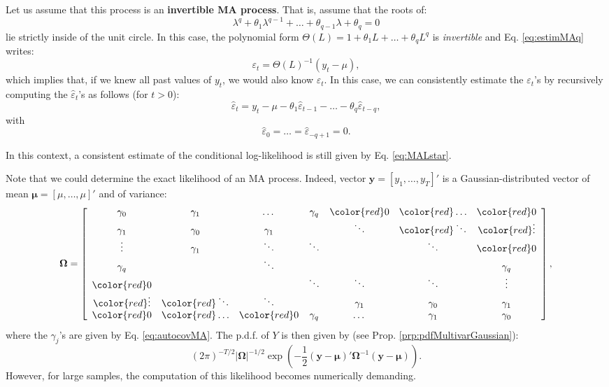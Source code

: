 \documentclass[
  12pt,
]{book}
\theoremstyle{definition}
\theoremstyle{definition}
\theoremstyle{definition}
\theoremstyle{definition}
\theoremstyle{remark}
\begin{document}
Let us assume that this process is an \textbf{invertible MA process}. That is, assume that the roots of:
\begin{equation}
\lambda^q + \theta_1 \lambda^{q-1} + \dots + \theta_{q-1} \lambda + \theta_q = 0 \label{eq:invertible}
\end{equation}
lie strictly inside of the unit circle. In this case, the polynomial form \(\Theta(L)=1 + \theta_1 L + \dots + \theta_q L^q\) is \emph{invertible} and Eq. \eqref{eq:estimMAq} writes:
\[
\varepsilon_t = \Theta(L)^{-1}(y_t - \mu),
\]
which implies that, if we knew all past values of \(y_t\), we would also know \(\varepsilon_t\). In this case, we can consistently estimate the \(\varepsilon_t\)'s by recursively computing the \(\hat\varepsilon_t\)'s as follows (for \(t>0\)):
\[
\hat\varepsilon_t = y_t - \mu - \theta_1 \hat\varepsilon_{t-1} - \dots  - \theta_q \hat\varepsilon_{t-q},
\]
with
\begin{equation}
\hat\varepsilon_{0}=\dots=\hat\varepsilon_{-q+1}=0.\label{eq:condiVarepsiMA}
\end{equation}

In this context, a consistent estimate of the conditional log-likelihood is still given by Eq. \eqref{eq:MALstar}.

Note that we could determine the exact likelihood of an MA process. Indeed, vector \(\mathbf{y} = [y_1,\dots,y_T]'\) is a Gaussian-distributed vector of mean \(\boldsymbol\mu = [\mu,\dots,\mu]'\) and of variance:
\[
\boldsymbol\Omega = \left[\begin{array}{ccccccc}
\gamma_0 & \gamma_1&\dots&\gamma_q&{\color{red}0}&{\color{red}\dots}&{\color{red}0}\\
\gamma_1 & \gamma_0&\gamma_1&&\ddots&{\color{red}\ddots}&{\color{red}\vdots}\\
\vdots & \gamma_1&\ddots&\ddots&&\ddots&{\color{red}0}\\
\gamma_q &&\ddots&&&&\gamma_q\\
{\color{red}0} &&&\ddots&\ddots&\ddots&\vdots\\
{\color{red}\vdots}&{\color{red}\ddots}&\ddots&&\gamma_1&\gamma_0&\gamma_1\\
{\color{red}0}&{\color{red}\dots}&{\color{red}0}&\gamma_q&\dots&\gamma_1&\gamma_0
\end{array}\right],
\]
where the \(\gamma_j\)'s are given by Eq. \eqref{eq:autocovMA}. The p.d.f. of \(Y\) is then given by (see Prop. \ref{prp:pdfMultivarGaussian}):
\[
(2\pi)^{-T/2}|\boldsymbol\Omega|^{-1/2}\exp\left( -\frac{1}{2} (\mathbf{y}-\boldsymbol\mu)' \boldsymbol\Omega^{-1} (\mathbf{y}-\boldsymbol\mu)\right).
\]
However, for large samples, the computation of this likelihood becomes numerically demanding.
\end{document}
